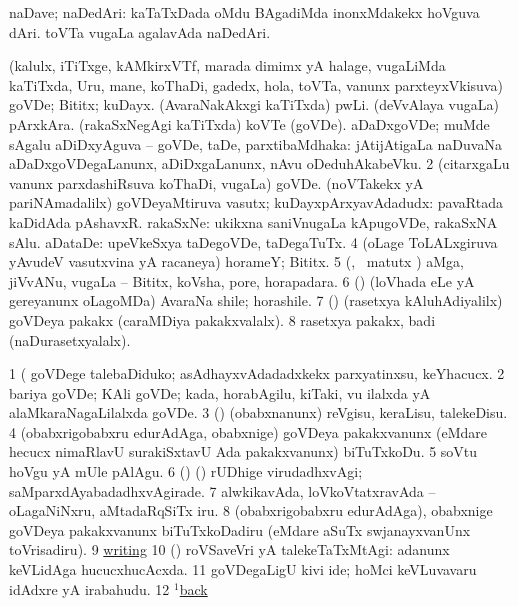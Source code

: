 \bentry
{} 
\gl{\nA}
\bmng
 naDave; naDedAri: 
\banum
{} kaTaTxDada oMdu BAgadiMda inonxMdakekx hoVguva dAri. 
 toVTa \mo vugaLa agalavAda naDedAri. 
\eanum
\emng
\eentry

\bentry
{} 
\gl{\nA}
\expl{}
\bmng
\bnum
{} (kalulx, iTiTxge, kAMkirxVTf, marada dimimx yA halage, \mo vugaLiMda kaTiTxda, Uru, mane, koThaDi, gadedx, hola, toVTa, \mo vanunx parxteyxVkisuva) 
\banum
{} goVDe; Bititx; kuDayx. 
 (AvaraNakAkxgi kaTiTxda) pwLi. 
 (deVvAlaya \mo vugaLa) pArxkAra. 
 (rakaSxNegAgi kaTiTxda) koVTe (goVDe). 
 aDaDxgoVDe; muMde sAgalu aDiDxyAguva -- goVDe, taDe, parxtibaMdhaka:  jAtijAtigaLa naDuvaNa aDaDxgoVDegaLanunx, aDiDxgaLanunx, nAvu oDeduhAkabeVku. 
\eanum
\numie
\num{2} (citarxgaLu \mo vanunx parxdashiRsuva koThaDi, \mo vugaLa) goVDe. 
 (noVTakekx yA pariNAmadalilx) goVDeyaMtiruva vasutx; kuDayxpArxyavAdadudx: 
\banum
{} pavaRtada kaDidAda pAshavxR. 
 rakaSxNe:  ukikxna saniVnugaLa kApugoVDe, rakaSxNA sAlu. 
 aDataDe:  upeVkeSxya taDegoVDe, taDegaTuTx. 
\eanum
\numie
\num{4} (oLage ToLALxgiruva yAvudeV vasutxvina yA racaneya) horameY; Bititx. 
\num{5} (\aMrashA, \pArxvi\ matutx \savi) aMga, jiVvANu, \mo vugaLa -- Bititx, koVsha, pore, horapadara. 
\num{6} (\Kani) (loVhada eLe yA gereyanunx oLagoMDa) AvaraNa shile; horashile. 
\num{7} (\pArxparx) (rasetxya kAluhAdiyalilx) goVDeya pakakx (caraMDiya pakakxvalalx). 
\num{8} rasetxya pakakx, badi (naDurasetxyalalx). 
\enum
\emng

\noindent 
\gl{\pagu}
\expl{}
\bmng
\bnum
\num{1}  (  goVDege talebaDiduko; asAdhayxvAdadadxkekx parxyatinxsu, keYhacucx. 
\num{2}  bariya goVDe; KAli goVDe; kada, horabAgilu, kiTaki, \mo vu ilalxda yA alaMkaraNagaLilalxda goVDe. 
\num{3}    (\AmA) (obabxnanunx) reVgisu, keraLisu, talekeDisu. 
\num{4}  (obabxrigobabxru edurAdAga, obabxnige) goVDeya pakakxvanunx (eMdare hecucx nimaRlavU surakiSxtavU Ada pakakxvanunx) biTuTxkoDu. 
\num{5}  soVtu hoVgu yA mUle pAlAgu. 
\num{6}  (\ame) (\ashi) rUDhige virudadhxvAgi; saMparxdAyabadadhxvAgirade. 
\num{7}  alwkikavAda, loVkoVtatxravAda -- oLagaNiNxru, aMtadaRqSiTx iru. 
\num{8}  (obabxrigobabxru edurAdAga), obabxnige goVDeya pakakxvanunx biTuTxkoDadiru (eMdare aSuTx swjanayxvanUnx toVrisadiru). 
\num{9}  \hyperlink{writing pagu(2)}{writing}  
\num{10}  (\AmA) roVSaveVri yA talekeTaTxMtAgi:  adanunx keVLidAga hucucxhucAcxda. 
\num{11}  goVDegaLigU kivi ide; hoMci keVLuvavaru idAdxre yA irabahudu. 
\num{12}  \hyperref{kandict_b.pdf}{B}{back(1) nuga(30)}{$^1$back}  
\enum
\emng
\eentry

